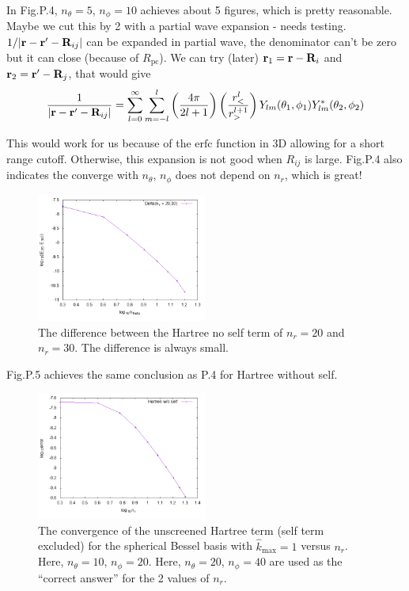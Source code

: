 \documentclass[paper=a4, fontsize=11pt]{article} %
\numberwithin{equation}{section} %
\numberwithin{figure}{section} %
\numberwithin{table}{section} %
\newcommand{\br}{{\bf{r}}}
\newcommand{\bR}{{\bf{R}}}
\newcommand{\rerfc}{{\mathrm{erfc}}}
\newcommand{\Rpc}{{R_{\mathrm{pc}}}}
\begin{document}
In Fig.P.4, $n_{\theta} = 5$, $n_{\phi} = 10$ achieves about 5 figures, which is pretty reasonable. Maybe we cut this by 2 with a partial wave expansion - needs testing. $1/|\br-\br'-\bR_{ij}|$ can be expanded in partial wave, the denominator can't be zero but it can close (because of $\Rpc$). We can try (later) $\br_1 = \br-\bR_i$ and $\br_2 = \br'- \bR_j$, that would give 
\begin{equation}
\frac{1}{|\br-\br'-\bR_{ij}|} = \sum_{l=0}^\infty \sum_{m=-l}^l  \left( \frac{4\pi}{2l+1}\right) \left( \frac{r_{<}^{l}}{r_{>}^{l+1}} \right) Y_{lm} (\theta_1,\phi_1) Y_{lm}^* (\theta_{2},\phi_{2}) 
\end{equation}

This would work for us because of the $\rerfc$ function in 3D allowing for a short range cutoff. Otherwise, this expansion is not good when $R_{ij}$ is large. Fig.P.4 also indicates the converge with $n_{\theta}$, $n_{\phi}$ does not depend on $n_r$, which is great!

\begin{figure}[h!] 
    \centering
    \includegraphics[width=0.5\textwidth]{nthetaHarwoselfdiff}
    \caption{The difference between the Hartree no self term of $n_r = 20$ and $n_r = 30$. The difference is always small.} 
    \label{fig:nthetaHarwoselfdiff}
\end{figure}

Fig.P.5 achieves the same conclusion as P.4 for Hartree without self.

\begin{figure}[h!] 
    \centering
    \includegraphics[width=0.5\textwidth]{nrHarwoself}
    \caption{The convergence of the unscreened Hartree term (self term excluded) for the spherical Bessel basis with $\hat {k}_{\mathrm{max}} = 1$ versus $n_r$. Here, $n_{\theta} = 10$, $n_{\phi} = 20$. Here, $n_{\theta} = 20$, $n_{\phi} = 40$ are used as the ``correct answer'' for the 2 values of $n_r$.} 
    \label{fig:nrHarwoself}
\end{figure}
\end{document}
